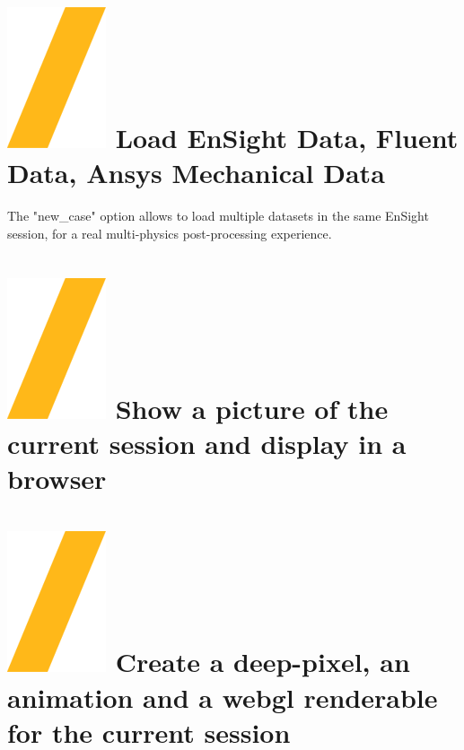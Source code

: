 \documentclass[9pt,landscape]{article}
\begin{document}
\begin{multicols}{3}

\section{\includegraphics[height=\fontcharht\font`\S]{slash.png} Load EnSight Data, Fluent Data, Ansys Mechanical Data}

The "new\_case" option allows to load multiple datasets in the same EnSight session, for a real multi-physics post-processing experience.



\section{\includegraphics[height=\fontcharht\font`\S]{slash.png} Show a picture of the current session and display in a browser}


\section{\includegraphics[height=\fontcharht\font`\S]{slash.png}  Create a deep-pixel, an animation and a webgl renderable for the current session}


\end{multicols}
\end{document}

